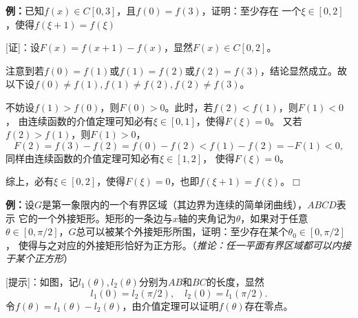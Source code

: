 {\bf 例：}已知$f(x)\in C[0,3]$，且$f(0)=f(3)$，证明：至少存在
一个$\xi\in[0,2]$，使得$f(\xi+1)=f(\xi)$

[证]：设$F(x)=f(x+1)-f(x)$，显然$F(x)\in C[0,2]$。

注意到若$f(0)=f(1)$或$f(1)=f(2)$或$f(2)=f(3)$，结论显然成立。故以下设$f(0)\ne f(1),
f(1)\ne f(2),f(2)\ne f(3)$。

不妨设$f(1)>f(0)$，则$F(0)>0$。此时，若$f(2)<f(1)$，则$F(1)<0$，
由连续函数的介值定理可知必有$\xi\in[0,1]$，使得$F(\xi)=0$。
又若$f(2)>f(1)$，则$F(1)>0$，
$$F(2)=f(3)-f(2)=f(0)-f(2)<f(1)-f(2)=-F(1)<0,$$
同样由连续函数的介值定理可知必有$\xi\in[1,2]$，
使得$F(\xi)=0$。

综上，必有$\xi\in[0,2]$，使得$F(\xi)=0$，也即$f(\xi+1)=f(\xi)$。\hfill $\Box$

{\bf 例：}设$G$是第一象限内的一个有界区域（其边界为连续的简单闭曲线），$ABCD$表示
它的一个外接矩形。矩形的一条边与$x$轴的夹角记为$\theta$，如果对于任意$\theta\in
[0,\pi/2]$，$G$总可以被某个外接矩形所围，证明：至少存在某个$\theta_0\in[0,\pi/2]$，
使得与之对应的外接矩形恰好为正方形。（{\it 推论：任一平面有界区域都可以内接于某个正方形}）

\begin{center}
\end{center}

[提示]：如图，记$l_1(\theta),l_2(\theta)$分别为$AB$和$BC$的长度，显然
$$l_1(0)=l_2(\pi/2),\quad l_2(0)=l_1(\pi/2).$$
令$f(\theta)=l_1(\theta)-l_2(\theta)$，由介值定理可以证明$f(\theta)$存在零点。

